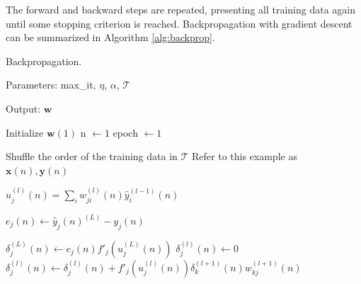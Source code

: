 The forward and backward steps are repeated, presenting all training data again until some stopping criterion is reached. Backpropagation with gradient descent can be summarized in Algorithm \ref{alg:backprop}.


\begin{algorithm}[h!]
    \caption{Backpropagation. \label{alg:backprop}}
    
    Parameters: max\_it, $\eta$, $\alpha$, $\mathcal{T}$
    
    Output: $\mathbf{w}$
    
    \begin{algorithmic}[1] 
        \STATE Initialize $\mathbf{w}(1)$
        \STATE n $\leftarrow 1$
        \STATE epoch $\leftarrow 1$

		\STATE Shuffle the order of the training data in $\mathcal{T}$
			\STATE Refer to this example as $\mathbf{x}(n),\mathbf{y}(n)$ 
                
                        \STATE $u_j^{(l)}(n) = \sum_i w_{ji}^{(l)}(n) \hat{y}_i^{(l-1)}(n)$ 
                    \ENDFOR

					
                \ENDFOR
            
            \ENDFOR
            

                    \STATE $e_j (n) \leftarrow \hat{y}_j(n)^{(L)} - y_j (n)$ 
            \ENDFOR


                        \STATE $ \delta_j^{(L)} (n) \leftarrow e_j(n) {f}'_j (u_j^{(L)}(n)) $ 
                    \ELSE
                    	  \STATE $\delta_j^{(l)} (n) \leftarrow 0$
                            \STATE $ \delta_j^{(l)} (n) \leftarrow \delta_j^{(l)} (n) + {f}'_j (u_j^{(l)}(n)) \delta_k^{(l+1)} (n) w_{kj}^{(l+1)}(n) $ 
                        \ENDFOR
                    \ENDIF


\end{algorithmic}
\end{algorithm}
